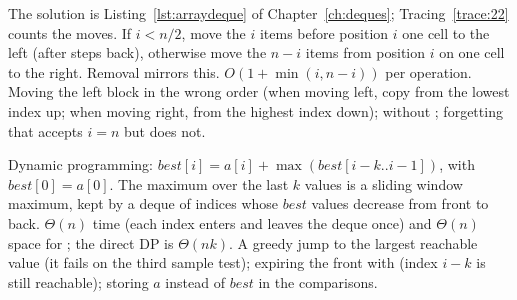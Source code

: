 The solution is Listing~\ref{lst:arraydeque} of Chapter~\ref{ch:deques};
Tracing~\ref{trace:22} counts the moves.
\idea If $i<n/2$, move the $i$ items before position $i$ one cell to the left (after
 steps back), otherwise move the $n-i$ items from position $i$ on one cell to the
right. Removal mirrors this.
\complexity $O(1+\min(i,n-i))$ per operation.
\mistakes Moving the left block in the wrong order (when moving left, copy from the lowest
index up; when moving right, from the highest index down);  without ;
forgetting that  accepts $i=n$ but  does not.

\idea Dynamic programming: $\mathit{best}[i]=a[i]+\max(\mathit{best}[i-k..i-1])$, with
$\mathit{best}[0]=a[0]$. The maximum over the last $k$ values is a sliding window maximum,
kept by a deque of indices whose $\mathit{best}$ values decrease from front to back.
\complexity $\Theta(n)$ time (each index enters and leaves the deque once) and $\Theta(n)$
space for ; the direct DP is $\Theta(nk)$.
\mistakes A greedy jump to the largest reachable value (it fails on the third sample test); expiring the front with  (index $i-k$ is still reachable);
storing $a$ instead of $\mathit{best}$ in the comparisons.
